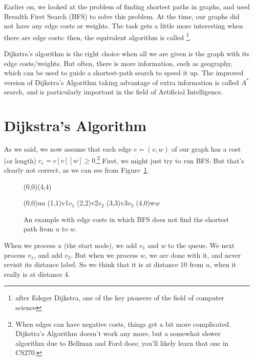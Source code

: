 Earlier on, we looked at the problem of finding shortest paths in
graphs, and used Breadth First Search (BFS) to solve this problem.
At the time, our graphs did not have any edge costs or weights.
The task gets a little more interesting when there are edge costs:
then, the equivalent algorithm is called \footnote{after Edsger Dijkstra, one of the key pioneers
  of the field of computer science}.

Dijkstra's algorithm is the right choice when all we are given is the
graph with its edge costs/weights. But often, there is more
information, such as geography, which can be used to guide a
shortest-path search to speed it up. The improved version of
Dijkstra's Algorithm taking advantage of extra information is called
$A^*$ search, and is particularly important in the field of Artificial
Intelligence.

\section{Dijkstra's Algorithm}

As we said, we now assume that each edge $e=(v,w)$ of our graph has a
cost (or length)  $c_e = c[v][w] \geq 0$.\footnote{When edges can have
  negative costs, things get a bit more complicated. Dijkstra's
  Algorithm doesn't work any more, but a somewhat slower algorithm due
  to Bellman and Ford does; you'll likely learn that one in CS270.}
First, we might just try to run BFS. But that's clearly not correct,
as we can see from Figure~\ref{fig:dijkstra}.

\begin{figure}[htb]
\begin{center}
\pspicture(0,0)(4,4)

\cnodeput[fillstyle=solid,fillcolor=lightgray](0,0){u}{$u$}
\cnodeput(1,1){v1}{$v_1$}
\cnodeput(2,2){v2}{$v_2$}
\cnodeput(3,3){v3}{$v_3$}
\cnodeput(4,0){w}{$w$}

 
 
 
 
 
 

\endpspicture
\end{center}
\caption{An example with edge costs in which BFS does not find the
  shortest path from $u$ to $w$. \label{fig:dijkstra}}
\end{figure}

When we process $u$ (the start node), we add $v_1$ and $w$ to the
queue. We next process $v_1$, and add $v_2$. 
But when we process $w$, we are done with it, and never revisit its
distance label. So we think that it is at distance 10 from $u$, when
it really is at distance $4$.

